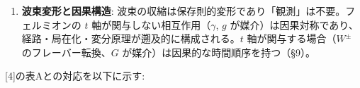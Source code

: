 \documentclass[
  a4paper,11pt]{ltjsarticle}
\theoremstyle{definition}
\theoremstyle{remark}
\begin{document}
\begin{enumerate}
  \textbf{質量の起源}: 定常波（\(\kappa_s = 1\), \(z\)
  軸）との結合が方向制約波の速度比 \(|k_{s_0} / k_t|\)
  を減少させ、\(v < c\) として質量を生む。\(z\) 軸を直接共有する第 3
  世代が最大の結合強度を持ち、世代間質量階層 \(m_3 \gg m_{1,2}\)
  の起源を与える。\(\kappa_s = 0\) のゲージボソン（\(\gamma\), \(g\),
  \(G\)）は結合軸を持たず質量ゼロ。\(W^{\pm}\),
  \(Z^0\)（\(\kappa_s = 1\)）は空間軸（\(x\),
  \(y\)）を持ち定常波との間接結合により質量を獲得する（§8）。
\item
  \textbf{波束変形と因果構造}:
  波束の収縮は保存則的変形であり「観測」は不要。フェルミオンの \(t\)
  軸が関与しない相互作用（\(\gamma\), \(g\)
  が媒介）は因果対称であり、経路・局在化・変分原理が遡及的に構成される。\(t\)
  軸が関与する場合（\(W^{\pm}\) のフレーバー転換、\(G\)
  が媒介）は因果的な時間順序を持つ（§9）。
\end{enumerate}

{[}4{]}の表Aとの対応を以下に示す:
\end{document}
